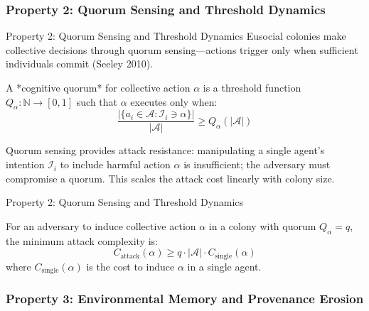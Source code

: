 \documentclass[
  ignorenonframetext,
]{beamer}
\begin{document}
\subsubsection{Property 2: Quorum Sensing and Threshold
Dynamics}\label{sec:quorum-sensing}

\begin{frame}[allowframebreaks]{Property 2: Quorum Sensing and Threshold
Dynamics}
Eusocial colonies make collective decisions through quorum
sensing---actions trigger only when sufficient individuals commit
(Seeley 2010).

\begin{definition}
\label{def:cognitive-quorum}
A *cognitive quorum* for collective action $\alpha$ is a threshold function $Q_\alpha: \mathbb{N} \to [0, 1]$ such that $\alpha$ executes only when:
\begin{equation}
\label{eq:quorum-eusocial}
\frac{|\{a_i \in \mathcal{A} : \mathcal{I}_i \ni \alpha\}|}{|\mathcal{A}|} \geq Q_\alpha(|\mathcal{A}|)
\end{equation}
\end{definition}

Quorum sensing provides attack resistance: manipulating a single agent's
intention \(\mathcal{I}_i\) to include harmful action \(\alpha\) is
insufficient; the adversary must compromise a quorum. This scales the
attack cost linearly with colony size.

\end{frame}

\begin{frame}[allowframebreaks]{Property 2: Quorum Sensing and Threshold
Dynamics}
\begin{corollary}
\label{cor:quorum-attack-cost}
For an adversary to induce collective action $\alpha$ in a colony with quorum $Q_\alpha = q$, the minimum attack complexity is:
\begin{equation}
\label{eq:quorum-cost}
C_{\text{attack}}(\alpha) \geq q \cdot |\mathcal{A}| \cdot C_{\text{single}}(\alpha)
\end{equation}
where $C_{\text{single}}(\alpha)$ is the cost to induce $\alpha$ in a single agent.
\end{corollary}
\end{frame}

\subsubsection{Property 3: Environmental Memory and Provenance
Erosion}\label{sec:environmental-memory}
\end{document}
